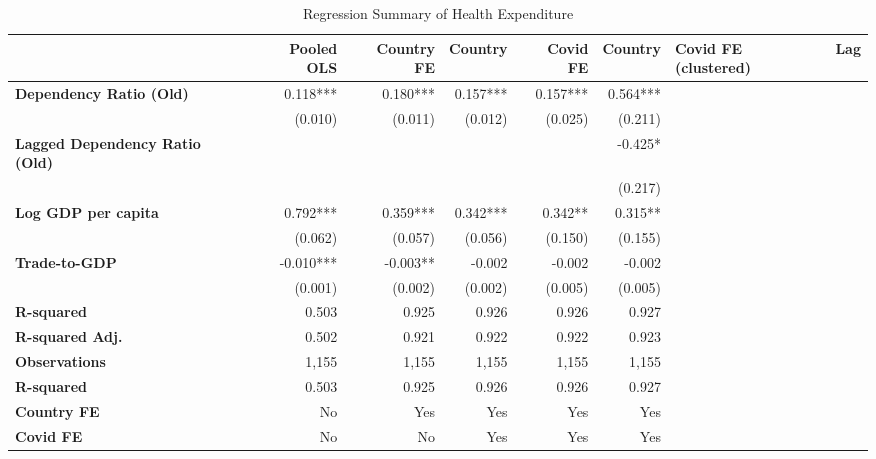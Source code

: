 \begin{table}
\caption{Regression Summary of Health Expenditure}
\label{tab3}
\begin{tabular}{lrrrrr}
\toprule
 & Pooled OLS & Country FE & Country & Covid FE & Country & Covid FE (clustered) & Lag \\
\midrule
\textbf{Dependency Ratio (Old)} & 0.118*** & 0.180*** & 0.157*** & 0.157*** & 0.564*** \\
\textbf{} & (0.010) & (0.011) & (0.012) & (0.025) & (0.211) \\
\textbf{Lagged Dependency Ratio (Old)} &  &  &  &  & -0.425* \\
\textbf{} &  &  &  &  & (0.217) \\
\textbf{Log GDP per capita} & 0.792*** & 0.359*** & 0.342*** & 0.342** & 0.315** \\
\textbf{} & (0.062) & (0.057) & (0.056) & (0.150) & (0.155) \\
\textbf{Trade-to-GDP} & -0.010*** & -0.003** & -0.002 & -0.002 & -0.002 \\
\textbf{} & (0.001) & (0.002) & (0.002) & (0.005) & (0.005) \\
\textbf{R-squared} & 0.503 & 0.925 & 0.926 & 0.926 & 0.927 \\
\textbf{R-squared Adj.} & 0.502 & 0.921 & 0.922 & 0.922 & 0.923 \\
\textbf{Observations} & 1,155 & 1,155 & 1,155 & 1,155 & 1,155 \\
\textbf{R-squared} & 0.503 & 0.925 & 0.926 & 0.926 & 0.927 \\
\textbf{Country FE} & No & Yes & Yes & Yes & Yes \\
\textbf{Covid FE} & No & No & Yes & Yes & Yes \\
\bottomrule
\end{tabular}
\end{table}
